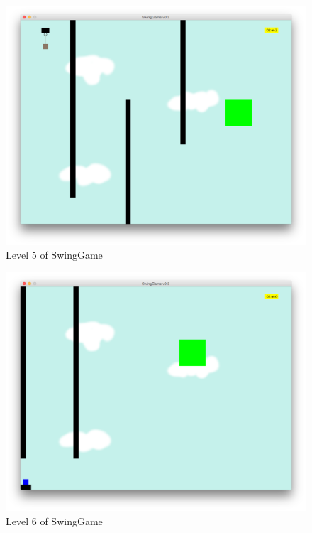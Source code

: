 \documentclass[]{report}
\begin{document}
\begin{appendices}
\begin{figure}[H]
			\includegraphics[scale=0.25]{level5}
			\caption{Level 5 of SwingGame}
			\label{level5}
		\end{figure}
		\begin{figure}[H]
			\centering
			\includegraphics[scale=0.25]{level6}
			\caption{Level 6 of SwingGame}
			\label{level6}
		\end{figure}
		\begin{figure}[H]
			\centering

\end{figure}
\end{appendices}
\end{document}
